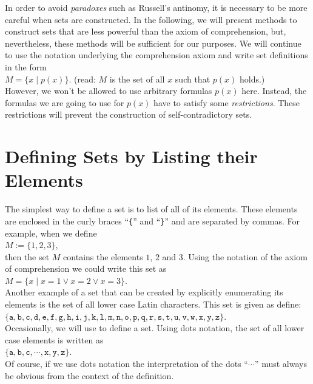 In order to avoid \emph{paradoxes} such as Russell's antinomy, it is necessary to be more careful when sets are
constructed.  In the following, we will present methods to construct sets that are less powerful than the 
axiom of comprehension, but, nevertheless, these methods will be sufficient for our purposes.  We will continue
to use the notation underlying the comprehension axiom and write set definitions in the form
\\[0.2cm]
\hspace*{1.3cm}
$M = \{ x \mid p(x) \}$. \qquad (read: $M$ is the set of all $x$ such that $p(x)$ holds.)  
\\[0.2cm]
However, we won't be allowed to use arbitrary formulas $p(x)$ here.  Instead, the formulas we are going to use
for $p(x)$ have to satisfy some \emph{restrictions}.  These restrictions will prevent the construction of
self-contradictory sets.


\section{Defining Sets by Listing their Elements}
The simplest way to define a set is to list of all of its elements. These elements are enclosed in the
curly braces  ``\texttt{\{}'' and ``\texttt{\}}'' and are separated by commas.
For example, when we define \\[0.2cm]
\hspace*{1.3cm} $M := \{ 1, 2, 3 \}$, \\[0.2cm]
then the set $M$ contains the elements $1$, $2$ and $3$.
Using  the notation of the axiom of comprehension we could write this set as \\[0.2cm]
\hspace*{1.3cm} 
$M = \{ x \mid x = 1 \vee x = 2 \vee x = 3 \}$.
\\[0.2cm]
Another example of a set that can be created by explicitly enumerating its elements
is the set of all lower case Latin characters.  This set is given as
define: \\[0.2cm]
\hspace*{1.3cm} 
$\{\mathtt{a}, \mathtt{b}, \mathtt{c}, \mathtt{d}, \mathtt{e},
 \mathtt{f}, \mathtt{g}, \mathtt{h}, \mathtt{i}, \mathtt{j}, \mathtt{k}, \mathtt{l},
 \mathtt{m}, \mathtt{n}, \mathtt{o}, \mathtt{p}, \mathtt{q}, \mathtt{r}, \mathtt{s},
 \mathtt{t}, \mathtt{u}, \mathtt{v}, \mathtt{w}, \mathtt{x}, \mathtt{y}, \mathtt{z}\}$.
 \\[0.2cm]
Occasionally, we will use  to define a set.  Using dots notation, the set of all lower case
elements is written as
\\[0.2cm]
\hspace*{1.3cm}
$\{ \mathtt{a}, \mathtt{b}, \mathtt{c}, \cdots, \mathtt{x}, \mathtt{y}, \mathtt{z}\} $.
\\[0.2cm]
Of course, if we use dots notation the interpretation of the dots ``$\cdots$'' must always be obvious from the
context of the definition. 

